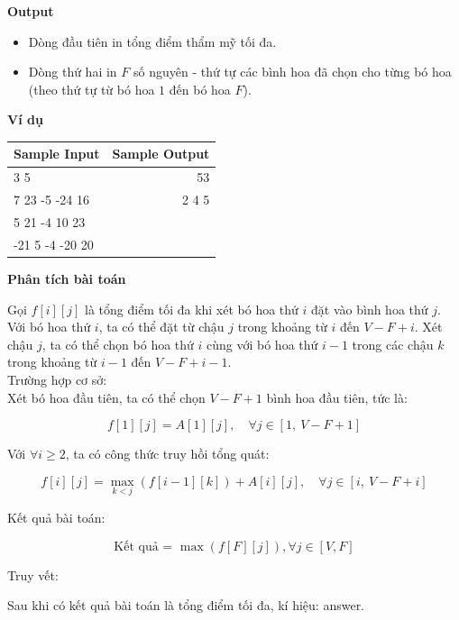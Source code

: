 \documentclass{article}
\begin{document}
\textbf{Output}
\begin{itemize}
    \item Dòng đầu tiên in tổng điểm thẩm mỹ tối đa.
    \item Dòng thứ hai in $F$ số nguyên - thứ tự các bình hoa đã chọn cho từng bó hoa (theo thứ tự từ bó hoa $1$ đến bó hoa $F$).
\end{itemize}

\textbf{Ví dụ}

\begin{table}[h]
    \centering
    \begin{tabular}{|l|r|}
        \hline
        \textbf{Sample Input} & \textbf{Sample Output} \\
        \hline
		3 5& 53 \\ 
		7 23 -5 -24 16& 2 4 5 \\
        5 21 -4 10 23 &     \\
        -21 5 -4 -20 20 & \\ 
		\hline
    \end{tabular}
\end{table}

\textbf{Phân tích bài toán}

Gọi $f[i][j]$ là tổng điểm tối đa khi xét bó hoa thứ $i$ đặt vào bình hoa thứ $j$.\\

Với bó hoa thứ $i$, ta có thể đặt từ chậu $j$ trong khoảng từ  $i$ đến $V - F + i$. Xét chậu $j$, ta có thể chọn bó hoa thứ $i$ cùng với bó hoa thứ $i - 1$ trong các chậu $k$ trong khoảng từ $i - 1$ đến $V - F + i - 1$.\\

Trường hợp cơ sở:\\

Xét bó hoa đầu tiên, ta có thể chọn $V - F + 1$ bình hoa đầu tiên, tức là:

\[
f[1][j] = A[1][j], \quad \forall j \in [1,\ V - F + 1]
\]

Với $\forall i \geq 2$, ta có công thức truy hồi tổng quát:

\[
f[i][j] = \max_{k < j} \left( f[i-1][k] \right) + A[i][j], \quad \forall j \in [i,\ V - F + i]
\]

Kết quả bài toán:

\[
\text{Kết quả = } \max \left( f[F][j] \right), \forall j \in [V, F]
\]

Truy vết:

Sau khi có kết quả bài toán là tổng điểm tối đa, kí hiệu: answer.\\
\end{document}
